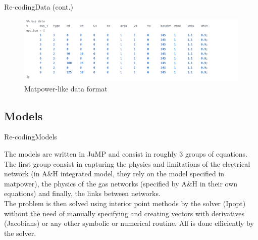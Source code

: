 \documentclass[handout]{beamer}
\begin{document}
\begin{frame}{Re-coding}{Data (cont.)}

\begin{figure}
\begin{center}
\includegraphics[width=\textwidth]{Matpowerlike2.png}
\end{center}
\caption{Matpower-like data format}\label{fig:matpowerlike}
\end{figure}


\end{frame}

\subsection*{Models}

\begin{frame}[t]{Re-coding}{Models}

  The models are written in JuMP and consist in roughly 3 groups of equations. The first group consist in capturing the physics and limitations of the electrical network (in A\&H integrated model, they rely on the model specified in matpower), the physics of the gas networks (specified by A\&H in their own equations) and finally, the links between networks.\\[6pt]

  The problem is then solved using interior point methods by the solver (Ipopt) without the need of manually specifying and creating vectors with derivatives (Jacobians) or any other symbolic or numerical routine. All is done efficiently by the solver.
\end{frame}
\end{document}
